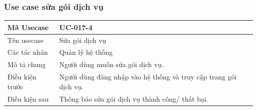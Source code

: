 \documentclass[12pt,a4paper]{article}
\begin{document}
    \subsubsection*{Use case sửa gói dịch vụ }
    \begin{table}[H]
        \centering
        \begin{tabular}{|p{3.5cm}|p{11.5cm}|c|}
            \hline
            Mã Usecase      & UC-017-4                                                         \\
            \hline
            Tên usecase     & Sửa gói dịch vụ                                                  \\
            \hline
            Các tác nhân    & Quản lý hệ thống                                                 \\
            \hline
            Mô tả chung     & Người dùng muốn sửa gói dịch vụ.                                 \\
            \hline

            Điều kiện trước & Người dùng đăng nhập vào hệ thống và truy cập trang gói dịch vụ. \\
            \hline

            Điều kiện sau   & Thông báo sửa gói dịch vụ thành công/ thất bại.                  \\
            \hline


\end{tabular}
\end{table}
\end{document}
